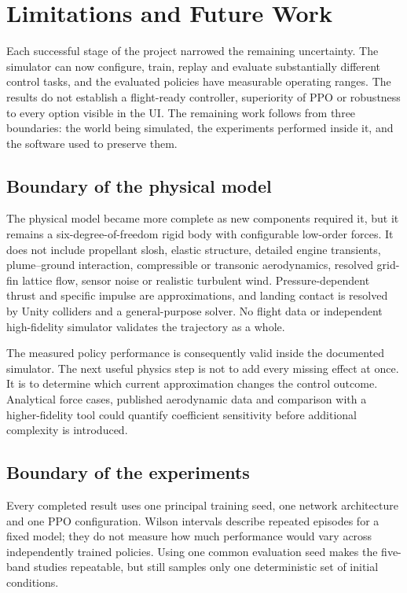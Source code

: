 \chapter{Limitations and Future Work}
\label{ch:limitations}

Each successful stage of the project narrowed the remaining uncertainty. The simulator can now
configure, train, replay and evaluate substantially different control tasks, and the evaluated
policies have measurable operating ranges. The results do not establish a flight-ready
controller, superiority of PPO or robustness to every option visible in the UI. The remaining
work follows from three boundaries: the world being simulated, the experiments performed inside
it, and the software used to preserve them.

\section{Boundary of the physical model}

The physical model became more complete as new components required it, but it remains a
six-degree-of-freedom rigid body with configurable low-order forces. It does not include
propellant slosh, elastic structure, detailed engine transients, plume--ground interaction,
compressible or transonic aerodynamics, resolved grid-fin lattice flow, sensor noise or
realistic turbulent wind. Pressure-dependent thrust and specific impulse are approximations,
and landing contact is resolved by Unity colliders and a general-purpose solver. No flight data
or independent high-fidelity simulator validates the trajectory as a whole.

The measured policy performance is consequently valid inside the documented simulator. The
next useful physics step is not to add every missing effect at once. It is to determine which
current approximation changes the control outcome. Analytical force cases, published
aerodynamic data and comparison with a higher-fidelity tool could quantify coefficient
sensitivity before additional complexity is introduced.

\section{Boundary of the experiments}

Every completed result uses one principal training seed, one network architecture and one PPO
configuration. Wilson intervals describe repeated episodes for a fixed model; they do not
measure how much performance would vary across independently trained policies. Using one common
evaluation seed makes the five-band studies repeatable, but still samples only one deterministic
set of initial conditions.

